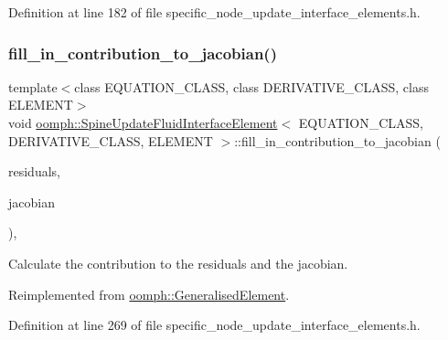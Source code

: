 Definition at line 182 of file specific\+\_\+node\+\_\+update\+\_\+interface\+\_\+elements.\+h.

\mbox{\label{classoomph_1_1SpineUpdateFluidInterfaceElement_a457ca93343689e34535054cf829a9499}} 
\subsubsection{\texorpdfstring{fill\+\_\+in\+\_\+contribution\+\_\+to\+\_\+jacobian()}{fill\_in\_contribution\_to\_jacobian()}}
{\footnotesize\ttfamily template$<$class E\+Q\+U\+A\+T\+I\+O\+N\+\_\+\+C\+L\+A\+SS, class D\+E\+R\+I\+V\+A\+T\+I\+V\+E\+\_\+\+C\+L\+A\+SS, class E\+L\+E\+M\+E\+NT$>$ \\
void \hyperlink{classoomph_1_1SpineUpdateFluidInterfaceElement}{oomph\+::\+Spine\+Update\+Fluid\+Interface\+Element}$<$ E\+Q\+U\+A\+T\+I\+O\+N\+\_\+\+C\+L\+A\+SS, D\+E\+R\+I\+V\+A\+T\+I\+V\+E\+\_\+\+C\+L\+A\+SS, E\+L\+E\+M\+E\+NT $>$\+::fill\+\_\+in\+\_\+contribution\+\_\+to\+\_\+jacobian (\begin{DoxyParamCaption}\item[{\hyperlink{classoomph_1_1Vector}{Vector}$<$ double $>$ \&}]{residuals,  }\item[{\hyperlink{classoomph_1_1DenseMatrix}{Dense\+Matrix}$<$ double $>$ \&}]{jacobian }\end{DoxyParamCaption})\hspace{0.3cm}{\ttfamily [inline]}, {\ttfamily [virtual]}}



Calculate the contribution to the residuals and the jacobian. 



Reimplemented from \hyperlink{classoomph_1_1GeneralisedElement_a6ae09fc0d68e4309ac1b03583d252845}{oomph\+::\+Generalised\+Element}.



Definition at line 269 of file specific\+\_\+node\+\_\+update\+\_\+interface\+\_\+elements.\+h.

